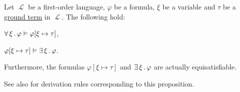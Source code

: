 \begin{proposition}\label{thm:quantifier_satisfiability}
  Let \( \mscrL \) be a first-order language, \( \varphi \) be a formula, \( \xi \) be a variable and \( \tau \) be a \hyperref[def:first_order_syntax/ground_term]{ground term} in \( \mscrL \). The following hold:

  \begin{thmenum}
     \( \forall \thinspace \xi \thinspace . \thinspace \varphi \vDash \varphi[\xi \mapsto \tau] \),

     \( \varphi[\xi \mapsto \tau] \vDash \exists \thinspace \xi \thinspace . \thinspace \varphi \).

    Furthermore, the formulas \( \varphi[\xi \mapsto \tau] \) and \( \exists \thinspace \xi \thinspace . \thinspace \varphi \) are actually equisatisfiable.
  \end{thmenum}

  See also  for derivation rules corresponding to this proposition.
\end{proposition}
